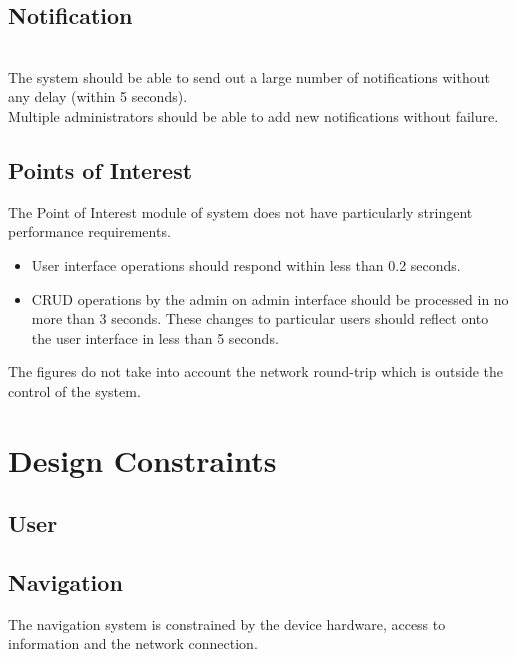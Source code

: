 \documentclass[runningheads,a4paper]{article}
\begin{document}
\subsection{Notification}
\mbox{}\\
The system should be able to send out a large number of notifications without any delay (within 5 seconds).\\
Multiple administrators should be able to add new notifications without failure.
\subsection{Points of Interest}
The Point of Interest module of system does not have particularly stringent performance requirements.

\begin{itemize}
\item User interface operations should respond within less than 0.2 seconds.

\item CRUD operations by the admin on admin interface should be processed in no more than 3 seconds. These changes to particular users should reflect onto the user interface in less than 5 seconds.
\end{itemize}

The figures do not take into account the network round-trip which is outside the control of the
system.

\section{Design Constraints}

\subsection{User}
\subsection{Navigation}

The navigation system is constrained by the device hardware, access to information and the network connection.
\end{document}
